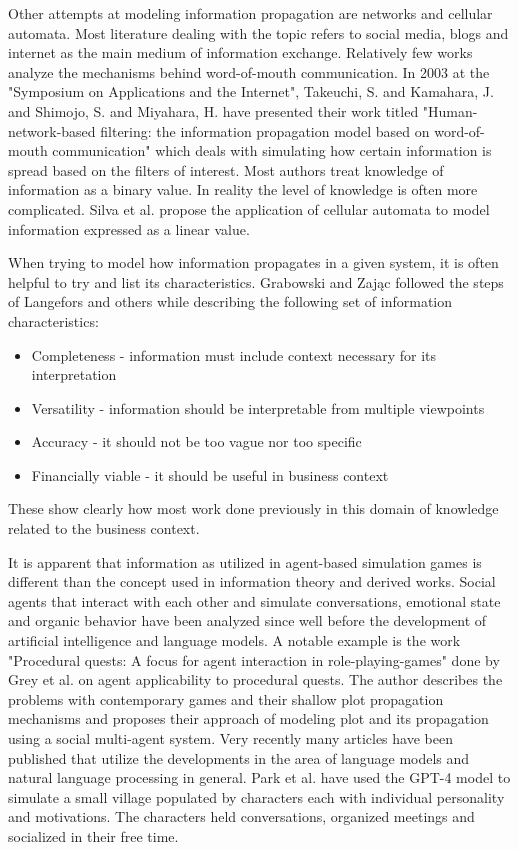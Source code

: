 Other attempts at modeling information propagation are networks\cite{rodriguez2013} and cellular automata\cite{silva2020}.
Most literature dealing with the topic refers to social media, blogs and internet as the main medium of information exchange.
Relatively few works analyze the mechanisms behind word-of-mouth communication.
In 2003 at the "Symposium on Applications and the Internet", Takeuchi, S. and Kamahara, J. and Shimojo, S. and Miyahara, H. have presented their work titled "Human-network-based filtering: the information propagation model based on word-of-mouth communication" which deals with simulating how certain information is spread based on the filters of interest\cite{takeuchi1183031}.
Most authors treat knowledge of information as a binary value.
In reality the level of knowledge is often more complicated.
Silva et al.\cite{silva2020} propose the application of cellular automata to model information expressed as a linear value.

When trying to model how information propagates in a given system, it is often helpful to try and list its characteristics.
Grabowski and Zając followed the steps of Langefors and others while describing the following set of information characteristics:
\begin{itemize}
    \item Completeness - information must include context necessary for its interpretation
    \item Versatility - information should be interpretable from multiple viewpoints
    \item Accuracy - it should not be too vague nor too specific
    \item Financially viable - it should be useful in business context
\end{itemize}
These show clearly how most work done previously in this domain of knowledge related to the business context.

It is apparent that information as utilized in agent-based simulation games is different than the concept used in information theory and derived works.
Social agents that interact with each other and simulate conversations, emotional state and organic behavior have been analyzed since well before the development of artificial intelligence and language models.
A notable example is the work "Procedural quests: A focus for agent interaction in role-playing-games" done by Grey et al. on agent applicability to procedural quests\cite{grey2011procedural}.
The author describes the problems with contemporary games and their shallow plot propagation mechanisms and proposes their approach of modeling plot and its propagation using a social multi-agent system.
Very recently many articles have been published that utilize the developments in the area of language models and natural language processing in general.
Park et al.\cite{park2023generative} have used the GPT-4 model\cite{openai2023gpt4} to simulate a small village populated by characters each with individual personality and motivations.
The characters held conversations, organized meetings and socialized in their free time.

